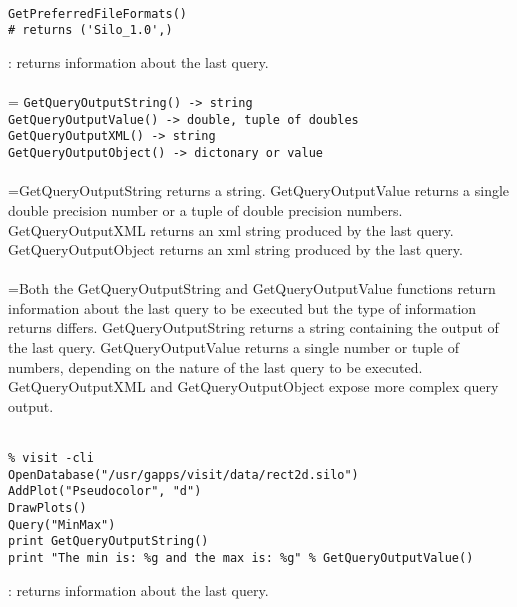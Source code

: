 \documentclass[10pt,a4paper]{report}
\begin{document}
\\[-6mm]
\begin{verbatim}GetPreferredFileFormats()
# returns ('Silo_1.0',)
\end{verbatim}
\newpage


{}
: returns information about the last query.\\[-3mm]

 \\ 
\hangindent=\parindent 
\verb!GetQueryOutputString() -> string!\\ 
\verb!GetQueryOutputValue() -> double, tuple of doubles!\\ 
\verb!GetQueryOutputXML() -> string!\\ 
\verb!GetQueryOutputObject() -> dictonary or value!\\ [-3mm]

 \\ 
\hangindent=\parindent GetQueryOutputString returns a string. GetQueryOutputValue returns a single double precision number or a tuple of double precision numbers. GetQueryOutputXML returns an xml string produced by the last query. GetQueryOutputObject returns an xml string produced by the last query. \\[-3mm] 

 \\ 
\hangindent=\parindent Both the GetQueryOutputString and GetQueryOutputValue functions return information about the last query to be executed but the type of information returns differs. GetQueryOutputString returns a string containing the output of the last query. GetQueryOutputValue returns a single number or tuple of numbers, depending on the nature of the last query to be executed.  GetQueryOutputXML and GetQueryOutputObject expose more complex query output. \\[-3mm] 

\\[-6mm]
\begin{verbatim}% visit -cli
OpenDatabase("/usr/gapps/visit/data/rect2d.silo")
AddPlot("Pseudocolor", "d")
DrawPlots()
Query("MinMax")
print GetQueryOutputString()
print "The min is: %g and the max is: %g" % GetQueryOutputValue()
\end{verbatim}
\newpage


{}
: returns information about the last query.\\[-3mm]
\end{document}
